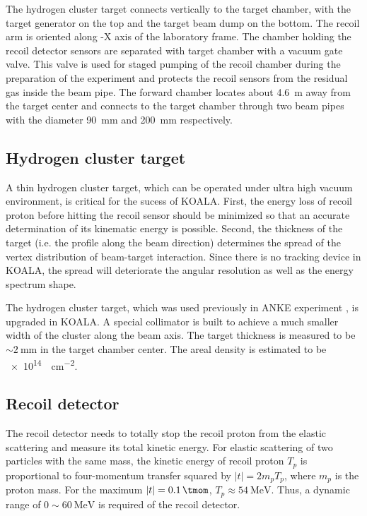 \documentclass[number,5p]{elsarticle}
\begin{document}
The hydrogen cluster target connects vertically to the target chamber, with the target generator on the top and the target beam dump on the bottom.
The recoil arm is oriented along -X axis of the laboratory frame.
The chamber holding the recoil detector sensors are separated with target
chamber with a vacuum gate valve.
This valve is used for staged pumping of the recoil chamber during the
preparation of the experiment and protects the recoil sensors from the residual
gas inside the beam pipe.
The forward chamber locates about \SI{4.6}{\meter} away from the target center and
connects to the target chamber through two beam pipes with the diameter \SI{90}{\mm} and \SI{200}{\mm} respectively. 

\subsection{Hydrogen cluster target}
\label{sec:target}

A thin hydrogen cluster target, which can be operated under ultra high vacuum
environment, is critical for the sucess of KOALA.
First, the energy loss of recoil proton before hitting the recoil sensor should
be minimized so that an accurate determination of its kinematic energy is possible.
Second, the thickness of the target (i.e. the profile along the beam direction) determines
the spread of the vertex distribution of beam-target interaction.
Since there is no tracking device in KOALA, the spread will deteriorate the
angular resolution as well as the energy spectrum shape.

The hydrogen cluster target, which was used previously in ANKE experiment
\cite{cluster_target}, is upgraded in KOALA.
A special collimator is built to achieve a much
smaller width of the cluster along the beam axis.
The target thickness is measured to be $\sim\SI{2}{\mm}$ in the target chamber center.
The areal density is estimated to be \SI{e14}{\atom\per\cm\squared}.

\subsection{Recoil detector}
\label{sec:recoil}

The recoil detector needs to totally stop the recoil proton from the
elastic scattering and measure its total kinetic energy.
For elastic scattering of two particles with the same mass,
the kinetic energy of recoil proton \(T_p\) is proportional to four-momentum
transfer squared by \(|t| = 2m_pT_p\), where \(m_p\) is the proton mass.
For the maximum $|t|=\SI{0.1}{\tmom}$, \(T_p \approx \SI{54}{\MeV}\). Thus, a dynamic range of
$0\sim\SI{60}{\MeV}$ is required of the recoil detector.
\end{document}
